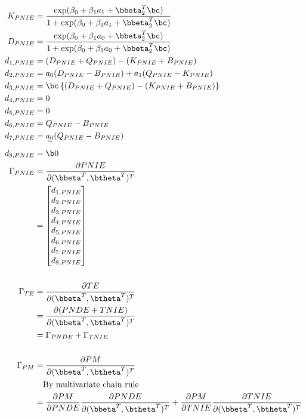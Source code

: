 \documentclass[10pt]{article}
\begin{document}
\begin{align*}
  K_{PNIE} &= \frac
      {    \exp(\beta_{0} + \beta_{1}a_{1} + \bbeta_{2}^{T}\bc)}
      {1 + \exp(\beta_{0} + \beta_{1}a_{1} + \bbeta_{2}^{T}\bc)}\\
  D_{PNIE} &= \frac
      {    \exp(\beta_{0} + \beta_{1}a_{0} + \bbeta_{2}^{T}\bc)}
      {1 + \exp(\beta_{0} + \beta_{1}a_{0} + \bbeta_{2}^{T}\bc)}\\
  d_{1,PNIE} &= (D_{PNIE} + Q_{PNIE}) - (K_{PNIE} + B_{PNIE})\\
  d_{2,PNIE} &= a_{0}(D_{PNIE} - B_{PNIE}) + a_{1}(Q_{PNIE} - K_{PNIE})\\
  d_{3,PNIE} &= \bc \left\{ (D_{PNIE} + Q_{PNIE}) - (K_{PNIE} + B_{PNIE}) \right\}\\
  d_{4,PNIE} &= 0\\
  d_{5,PNIE} &= 0\\
  d_{6,PNIE} &= Q_{PNIE} - B_{PNIE}\\
  d_{7,PNIE} &= \uwave{a_{0}} (Q_{PNIE} - B_{PNIE})\\
  d_{8,PNIE} &= \b0\\
  \Gamma_{PNIE}
  &= \frac{\partial PNIE}{\partial (\bbeta^{T},\btheta^{T})^{T}}\\
  &= \begin{bmatrix}
      d_{1,PNIE}\\
      d_{2,PNIE}\\
      d_{3,PNIE}\\
      d_{4,PNIE}\\
      d_{5,PNIE}\\
      d_{6,PNIE}\\
      d_{7,PNIE}\\
      d_{8,PNIE}\\
    \end{bmatrix}\\
  \\
  \Gamma_{TE}
  &= \frac{\partial TE}{\partial (\bbeta^{T},\btheta^{T})^{T}}\\
  &= \frac{\partial (PNDE+TNIE)}{\partial (\bbeta^{T},\btheta^{T})^{T}}\\
  &= \Gamma_{PNDE} + \Gamma_{TNIE}\\
  \\
  \Gamma_{PM}
  &= \frac{\partial PM}{\partial (\bbeta^{T},\btheta^{T})^{T}}\\
  &~~~\text{By multivariate chain rule}\\
  &= \frac{\partial PM}{\partial PNDE}\frac{\partial PNDE}{\partial (\bbeta^{T},\btheta^{T})^{T}} + \frac{\partial PM}{\partial TNIE}\frac{\partial TNIE}{\partial (\bbeta^{T},\btheta^{T})^{T}}\\

\end{align*}
\end{document}

